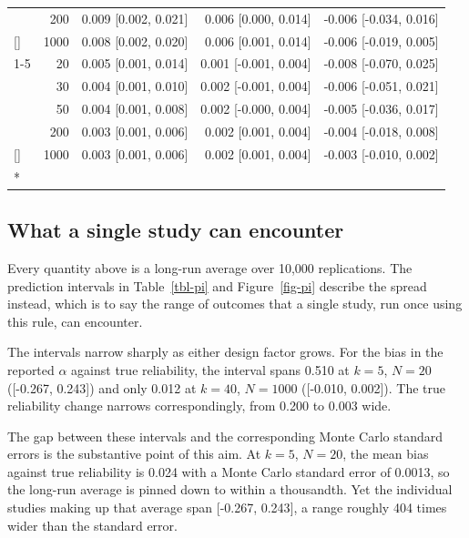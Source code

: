\documentclass[
  nonatbib,
  authoryear,
  preprint]{elsarticle}
\begin{document}
\begin{longtable}[t]{lrrrr}
\nopagebreak
 & 200 & 0.009 [0.002, 0.021] & 0.006 [0.000, 0.014] & -0.006 [-0.034, 0.016]\\
\nopagebreak
\multirow[t]{-4}{*}[\normalbaselineskip]{\raggedright\arraybackslash 20} & 1000 & 0.008 [0.002, 0.020] & 0.006 [0.001, 0.014] & -0.006 [-0.019, 0.005]\\
\cmidrule{1-5}\pagebreak[0]
 & 20 & 0.005 [0.001, 0.014] & 0.001 [-0.001, 0.004] & -0.008 [-0.070, 0.025]\\
\nopagebreak
 & 30 & 0.004 [0.001, 0.010] & 0.002 [-0.001, 0.004] & -0.006 [-0.051, 0.021]\\
\nopagebreak
 & 50 & 0.004 [0.001, 0.008] & 0.002 [-0.000, 0.004] & -0.005 [-0.036, 0.017]\\
\nopagebreak
 & 200 & 0.003 [0.001, 0.006] & 0.002 [0.001, 0.004] & -0.004 [-0.018, 0.008]\\
\nopagebreak
\multirow[t]{-4}{*}[\normalbaselineskip]{\raggedright\arraybackslash 40} & 1000 & 0.003 [0.001, 0.006] & 0.002 [0.001, 0.004] & -0.003 [-0.010, 0.002]\\*

\end{longtable}

\endgroup{}

\subsection{What a single study can
encounter}\label{what-a-single-study-can-encounter}

Every quantity above is a long-run average over 10,000 replications. The
prediction intervals in Table~\ref{tbl-pi} and Figure~\ref{fig-pi}
describe the spread instead, which is to say the range of outcomes that
a single study, run once using this rule, can encounter.

The intervals narrow sharply as either design factor grows. For the bias
in the reported \(\alpha\) against true reliability, the interval spans
0.510 at \(k = 5\), \(N = 20\) ({[}-0.267, 0.243{]}) and only 0.012 at
\(k = 40\), \(N = 1000\) ({[}-0.010, 0.002{]}). The true reliability
change narrows correspondingly, from 0.200 to 0.003 wide.

The gap between these intervals and the corresponding Monte Carlo
standard errors is the substantive point of this aim. At \(k = 5\),
\(N = 20\), the mean bias against true reliability is 0.024 with a Monte
Carlo standard error of 0.0013, so the long-run average is pinned down
to within a thousandth. Yet the individual studies making up that
average span {[}-0.267, 0.243{]}, a range roughly 404 times wider than
the standard error.
\end{document}
